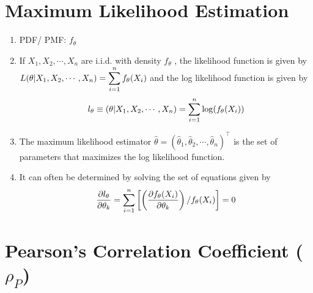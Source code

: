 \section{Maximum Likelihood Estimation \cite{ism-1}} \label{Multivariate Distributions: Maximum Likelihood Estimation}

\begin{enumerate}[itemsep=0.2cm]
    \item PDF/ PMF: $f_\theta$

    \item If $X_1, X_2,\cdots, X_n$ are i.i.d. with density $f_\theta$ , the likelihood function is given by $L (\theta|X_1, X_2,\cdots, X_n) = \displaystyle\sum ^n _{i=1} f_\theta (X_i)$ and the log likelihood function is given by
    \[
        l_\theta 
        \equiv  (\theta|X_1, X_2,\cdots, X_n) 
        = \displaystyle\sum_{i=1}^n \log (f_\theta (X_i))        
    \]

    \item The maximum likelihood estimator $\hat{\theta} = (\hat{\theta}_1, \hat{\theta}_2,\cdots, \hat{\theta}_n)^\top$ is the set of parameters that maximizes the log likelihood function.

    \item It can often be determined by solving the set of equations given by 
    \[
        \dfrac{\partial l_\theta}{\partial \theta_k}
        = \displaystyle\sum_{i=1}^n \left[
            \left(
                \dfrac{\partial f_\theta(X_i)}{\partial \theta_k}
            \right) /
            f_\theta(X_i)
        \right]
        = 0
    \]
\end{enumerate}



\section{Pearson’s Correlation Coefficient ($\rho_P$) \cite{ism-1,mfml-1}} \label{Multivariate Distributions: Pearson’s Correlation Coefficient}

